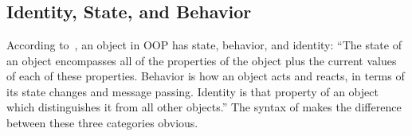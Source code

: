 \begin{figure*}
\begin{multicols}{2}
\begin{tabbing}
  \> \alt {} \V{:}  \\
  \> \alt {}  \\
  \> \alt {}   \\
 \df {} \alt {} \alt {} \alt \V{\$} \\
  \> \alt \V{\^{}} \alt \V{*} \alt {}  \\
 \df {} \alt {} \alt {} \\
  \> \alt {} \alt {} \alt {} \\
 \df {}  \\
 \df \RE{[\textbackslash{}dA-F][\textbackslash{}dA-F]} \\
 \df {} \\
 \df {} \\
 \df {} \\
 \df {} \\
 \df {}  \\
 \df {} \\
\end{tabbing}
\end{multicols}
\label{fig:bnf}
\end{figure*}

\subsection{Identity, State, and Behavior}

According to~\citet{grady2007object}, an object in OOP has state, behavior, and identity:
``The state of an object encompasses all of the properties of
the object plus the current values of each of these properties.
Behavior is how an object acts and reacts, in terms of its state changes and message passing.
Identity is that property of an object which distinguishes it from all other objects.''
The syntax of \eo{} makes the difference between these three categories obvious.

